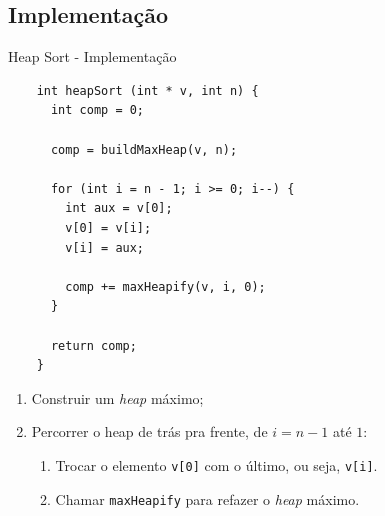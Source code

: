 \documentclass[t, 10pt]{beamer}
\begin{document}
  \subsection{Implementação}
  \begin{frame}[fragile]{Heap Sort - Implementação}
    \begin{center}
    \begin{minipage}{0.52\textwidth}
    \begin{verbatim}
    int heapSort (int * v, int n) {
      int comp = 0;
      
      comp = buildMaxHeap(v, n);
      
      for (int i = n - 1; i >= 0; i--) {
        int aux = v[0];
        v[0] = v[i];
        v[i] = aux;
        
        comp += maxHeapify(v, i, 0);
      }
      
      return comp;
    }
    \end{verbatim}
    \end{minipage}
    \end{center}

    \vspace{-0.5em}
    \begin{enumerate}
      \item<2-> Construir um \emph{heap} máximo;
      \item<3-> Percorrer o heap de trás pra frente, de $i = n - 1$ até $1$:
      \begin{enumerate}
        \item<4-> Trocar o elemento \texttt{v[0]} com o último, ou seja, \texttt{v[i]}.
        \item<5> Chamar \texttt{maxHeapify} para refazer o \emph{heap} máximo.
      \end{enumerate}
    \end{enumerate}

    \vspace{-0.5em}
    {}
    
  \end{frame}
\end{document}
